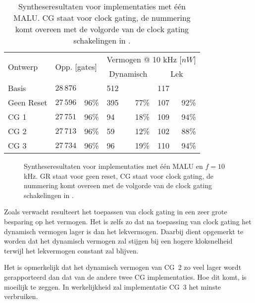 \begin{table}[h]
	\caption[Syntheseresultaten voor implementaties met \'e\'en MALU]{Syntheseresultaten voor implementaties met \'e\'en MALU. CG staat voor clock gating, de nummering komt overeen met de volgorde van de clock gating schakelingen in .}
	\label{tabel-resultaten-optimalisaties}

	\centering
	\begin{tabular}{llrlrlr}
		\toprule
		\multirow{2}{*}{Ontwerp}	& \multicolumn{2}{l}{\multirow{2}{*}{Opp. [gates]}}	& \multicolumn{4}{c}{Vermogen @ 10 kHz [$nW$]}\\
		\cmidrule{4-7}
		&	& & \multicolumn{2}{c}{Dynamisch}	& \multicolumn{2}{c}{Lek}\\
		\midrule
		Basis			& $28\,876$	& 			& 512	&	 		& 117 & \\
		Geen Reset	& $27\,596$	& 96\%	& 395	& 77\%	& 107 & 92\%\\
		CG 1			& $27\,751$	& 96\%	& 94	& 18\%	& 109	& 94\%\\
		CG 2			& $27\,713$	& 96\%	& 59	& 12\%	& 102	& 88\%\\
		CG 3			& $27\,734$	& 96\%	& 96	& 19\%	& 110	& 94\%\\
		\bottomrule		
	\end{tabular}
\end{table}

\begin{figure}[h]
	\centering
		\caption[Syntheseresultaten voor implementaties met \'e\'en MALU en $f = 10$ kHz]{Syntheseresultaten voor implementaties met \'e\'en MALU en $f = 10$ kHz. GR staat voor geen reset, CG staat voor clock gating, de nummering komt overeen met de volgorde van de clock gating schakelingen in .\label{figuur-resultaten-m1}}
\end{figure}

Zoals verwacht resulteert het toepassen van clock gating in een zeer grote besparing op het vermogen. Het is zelfs zo dat na toepassing van clock gating het dynamisch vermogen lager is dan het lekvermogen. Daarbij dient opgemerkt te worden dat het dynamisch vermogen zal stijgen bij een hogere kloksnelheid terwijl het lekvermogen constant zal blijven.

Het is opmerkelijk dat het dynamisch vermogen van CG~2 zo veel lager wordt gerapporteerd dan dat van de andere twee CG implementaties. Hoe dit komt, is moeilijk  te zeggen. In werkelijkheid zal implementatie CG~3 het minste verbruiken. 

